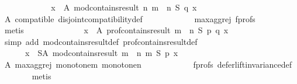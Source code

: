 \begin{isabellebody}
\ \ \ \ \isamarkupfalse%
\ \isamarkupfalse%
\isanewline
\ \ \ \ \ \ {\isachardoublequoteopen}{\isasymforall}x\ {\isasymin}\ A{\isachardot}{\kern0pt}\ mod{\isacharunderscore}{\kern0pt}contains{\isacharunderscore}{\kern0pt}result\ n\ {\isacharparenleft}{\kern0pt}m\ {\isasymparallel}\isactrlsub {\isasymup}\ n{\isacharparenright}{\kern0pt}\ S\ q\ x{\isachardoublequoteclose}\isanewline
\ \ \ \ \ \ \isamarkupfalse%
\ A\ compatible\ disjoint{\isacharunderscore}{\kern0pt}compatibility{\isacharunderscore}{\kern0pt}def\isanewline
\ \ \ \ \ \ \ \ \ \ \ \ max{\isacharunderscore}{\kern0pt}agg{\isacharunderscore}{\kern0pt}rej{}\ f{\isacharunderscore}{\kern0pt}profs\isanewline
\ \ \ \ \ \ \isamarkupfalse%
\ metis\isanewline
\ \ \ \ \isamarkupfalse%
\ \isamarkupfalse%
\ {}{}{\isacharcolon}{\kern0pt}\isanewline
\ \ \ \ \ \ {\isachardoublequoteopen}{\isasymforall}x\ {\isasymin}\ A{\isachardot}{\kern0pt}\ prof{\isacharunderscore}{\kern0pt}contains{\isacharunderscore}{\kern0pt}result\ {\isacharparenleft}{\kern0pt}m\ {\isasymparallel}\isactrlsub {\isasymup}\ n{\isacharparenright}{\kern0pt}\ S\ p\ q\ x{\isachardoublequoteclose}\isanewline
\ \ \ \ \ \ \isamarkupfalse%
\ {\isacharparenleft}{\kern0pt}simp\ add{\isacharcolon}{\kern0pt}\ mod{\isacharunderscore}{\kern0pt}contains{\isacharunderscore}{\kern0pt}result{\isacharunderscore}{\kern0pt}def\ prof{\isacharunderscore}{\kern0pt}contains{\isacharunderscore}{\kern0pt}result{\isacharunderscore}{\kern0pt}def{\isacharparenright}{\kern0pt}\isanewline
\ \ \ \ \isamarkupfalse%
\isanewline
\ \ \ \ \ \ {\isachardoublequoteopen}{\isasymforall}x\ {\isasymin}\ S{\isacharminus}{\kern0pt}A{\isachardot}{\kern0pt}\ mod{\isacharunderscore}{\kern0pt}contains{\isacharunderscore}{\kern0pt}result\ {\isacharparenleft}{\kern0pt}m\ {\isasymparallel}\isactrlsub {\isasymup}\ n{\isacharparenright}{\kern0pt}\ m\ S\ p\ x{\isachardoublequoteclose}\isanewline
\ \ \ \ \ \ \isamarkupfalse%
\ A\ max{\isacharunderscore}{\kern0pt}agg{\isacharunderscore}{\kern0pt}rej{}\ monotone{\isacharunderscore}{\kern0pt}m\ monotone{\isacharunderscore}{\kern0pt}n\isanewline
\ \ \ \ \ \ \ \ \ \ \ \ f{\isacharunderscore}{\kern0pt}profs\ defer{\isacharunderscore}{\kern0pt}lift{\isacharunderscore}{\kern0pt}invariance{\isacharunderscore}{\kern0pt}def\isanewline
\ \ \ \ \ \ \isamarkupfalse%
\ metis\isanewline
\ \ \ \ \isamarkupfalse%
\ \isamarkupfalse%

\end{isabellebody}
